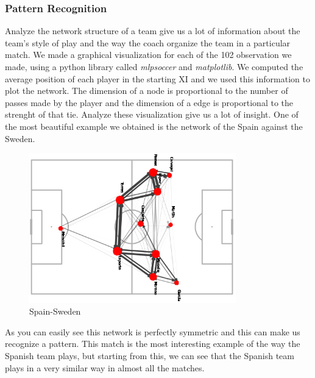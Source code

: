 \documentclass[12pt, a4paper]{article}
\begin{document}
\subsubsection{Pattern Recognition}
Analyze the network structure of a team give us a lot of information about the team's style of play and the way the coach organize the team in a particular match. We made a graphical visualization for each of the 102 observation we made, using a python library called \emph{mlpsoccer} and \emph{matplotlib}. We computed the average position of each player in the starting XI and we used this information to plot the network. The dimension of a node is proportional to the number of passes made by the player and the dimension of a edge is proportional to the strenght of that tie. Analyze these visualization give us a lot of insight. One of the most beautiful example we obtained is the network of the Spain against the Sweden. \\
\begin{figure}[H]
        \centering
        \includegraphics[width=0.8\textwidth]{../NoSubs/ImagesToRedo/Spain_Network_Spain_Sweden.png}
        \caption{Spain-Sweden}
        \label{fig: spain_sweden}
\end{figure}
As you can easily see this network is perfectly symmetric and this can make us recognize a pattern. This match is the most interesting example of the way the Spanish team plays, but starting from this, we can see that the Spanish team plays in a very similar way in almost all the matches. \\
\end{document}
